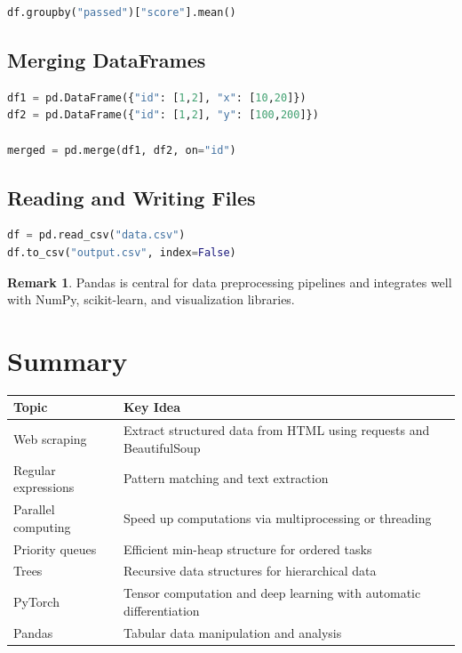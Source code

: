 \documentclass[12pt,oneside]{book}
\numberwithin{equation}{section}
\theoremstyle{definition}
\newtheorem{remark}{Remark}[section]
\theoremstyle{plain}
\theoremstyle{remark}
\begin{document}
\begin{lstlisting}[language=Python]
df.groupby("passed")["score"].mean()
\end{lstlisting}

\subsection{Merging DataFrames}

\begin{lstlisting}[language=Python]
df1 = pd.DataFrame({"id": [1,2], "x": [10,20]})
df2 = pd.DataFrame({"id": [1,2], "y": [100,200]})

merged = pd.merge(df1, df2, on="id")
\end{lstlisting}

\subsection{Reading and Writing Files}

\begin{lstlisting}[language=Python]
df = pd.read_csv("data.csv")
df.to_csv("output.csv", index=False)
\end{lstlisting}

\begin{remark}
Pandas is central for data preprocessing pipelines and integrates well with NumPy, scikit-learn, and visualization libraries.
\end{remark}

\section{Summary}

\begin{center}
\begin{xltabular}{\textwidth}{>{\raggedright\arraybackslash}p{0.3\textwidth}
>{\raggedright\arraybackslash}X}
\toprule
Topic & Key Idea \\
\midrule
Web scraping & Extract structured data from HTML using requests and BeautifulSoup \\

Regular expressions & Pattern matching and text extraction \\

Parallel computing & Speed up computations via multiprocessing or threading \\

Priority queues & Efficient min-heap structure for ordered tasks \\

Trees & Recursive data structures for hierarchical data \\

PyTorch & Tensor computation and deep learning with automatic differentiation \\

Pandas & Tabular data manipulation and analysis \\

\bottomrule
\end{xltabular}
\end{center}
\end{document}
